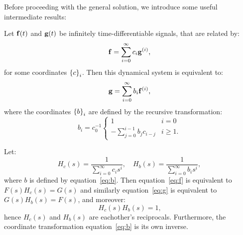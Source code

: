 Before proceeding with the general solution, we introduce some useful intermediate results:
\begin{lemma} \label{lemma:coord-transform}
Let $\mathbf{f}(t)$ and $\mathbf{g}(t)$ be infinitely time-differentiable signals, that are related by:
\begin{equation} \label{eq:f}
\mathbf{f} = \sum_{i=0}^\infty c_i \mathbf{g}^{(i)} \text{,}
\end{equation}
for some coordinates $\left\{ c \right\}_{i}$. Then this dynamical system is equivalent to:
\begin{equation} \label{eq:g}
\mathbf{g} = \sum_{i=0}^\infty b_i \mathbf{f}^{(i)} \text{,}
\end{equation}
where the coordinates $\left\{ b \right\}_{i}$ are defined by the recursive transformation:
\begin{equation} \label{eq:b}
b_i = c_0^{-1} \begin{cases}
    1 & i = 0 \\
    - \sum_{j=0}^{i-1} b_j c_{i - j} & i \ge 1 \text{.}
  \end{cases}
\end{equation}
\end{lemma}

\begin{corollary}
\label{cor:coord-transform}
Let: $$H_c(s) = \frac{1}{\sum_{i=0}^\infty c_i s^i}, \quad H_b(s) = \frac{1}{\sum_{i=0}^\infty b_i s^i}, $$ where $b$ is defined by equation~\ref{eq:b}. Then equation~\ref{eq:f} is equivalent to $F(s)H_c(s) = G(s)$ and similarly equation~\ref{eq:g} is equivalent to $G(s)H_b(s) = F(s)$, and moreover:
\begin{equation} \label{eq:inv}
H_c(s) H_b(s) = 1 \text{,}
\end{equation}
hence $H_c(s)$ and $H_b(s)$ are eachother's reciprocals. Furthermore, the coordinate transformation equation~\ref{eq:b} is its own inverse.
\end{corollary}

